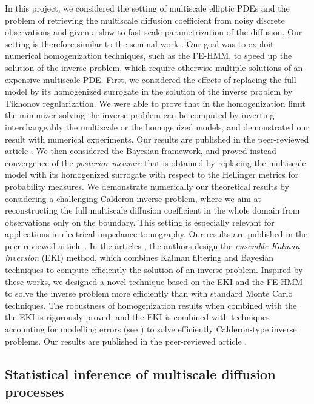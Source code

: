 \documentclass[10pt]{article}
\begin{document}
In this project, we considered the setting of multiscale elliptic PDEs and the problem of retrieving the multiscale diffusion coefficient from noisy discrete observations and given a slow-to-fast-scale parametrization of the diffusion. Our setting is therefore similar to the seminal work \cite{NPS12}. Our goal was to exploit numerical homogenization techniques, such as the FE-HMM, to speed up the solution of the inverse problem, which require otherwise multiple solutions of an expensive multiscale PDE. First, we considered the effects of replacing the full model by its homogenized surrogate in the solution of the inverse problem by Tikhonov regularization. We were able to prove that in the homogenization limit the minimizer solving the inverse problem can be computed by inverting interchangeably the multiscale or the homogenized models, and demonstrated our result with numerical experiments. Our results are published in the peer-reviewed article \cite{AbD19}. We then considered the Bayesian framework, and proved instead convergence of the \textit{posterior measure} that is obtained by replacing the multiscale model with its homogenized surrogate with respect to the Hellinger metrics for probability measures. We demonstrate numerically our theoretical results by considering a challenging Calderon inverse problem, where we aim at reconstructing the full multiscale diffusion coefficient in the whole domain from observations only on the boundary. This setting is especially relevant for applications in electrical impedance tomography. Our results are published in the peer-reviewed article \cite{AbD20}. In the articles \cite{ILS13,ScS17}, the authors design the \textit{ensemble Kalman inversion} (EKI) method, which combines Kalman filtering and Bayesian techniques to compute efficiently the solution of an inverse problem. Inspired by these works, we designed a novel technique based on the EKI and the FE-HMM to solve the inverse problem more efficiently than with standard Monte Carlo techniques. The robustness of homogenization results when combined with the the EKI is rigorously proved, and the EKI is combined with techniques accounting for modelling errors (see \cite{CES14,CDS18}) to solve efficiently Calderon-type inverse problems. Our results are published in the peer-reviewed article \cite{AGZ20}.
 
\subsection{Statistical inference of multiscale diffusion processes}\label{sec:AndreaZ}
\end{document}
